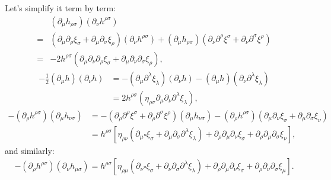 \documentclass[aps,prd,preprint]{revtex4-1}
\begin{document}
Let's simplify it term by term:
\begin{align}
& \left( \partial_\mu h_{\rho \sigma} \right) \left( \partial_\nu h^{\rho \sigma} \right)\\
= & \left( \partial_\mu \partial_\rho \xi_\sigma + \partial_\mu \partial_\sigma \xi_\rho \right)
    \left( \partial_\nu h^{\rho \sigma} \right) +
  \left( \partial_\mu h_{\rho \sigma} \right) \left( \partial_\nu \partial^\rho \xi^\sigma +
    \partial_\nu \partial^\sigma \xi^\rho \right) \\
= & -2 h^{\rho\sigma} \left( \partial_\mu \partial_\nu \partial_\rho \xi_\sigma +
    \partial_\mu \partial_\nu \partial_\sigma \xi_\rho \right), \label{eq:first-term}
\end{align}
\begin{align}
-\frac{1}{2} \left( \partial_\mu h \right) \left( \partial_\nu h \right) & =
  -\left( \partial_\mu \partial^\lambda \xi_\lambda \right) \left( \partial_\nu h \right) -
  \left( \partial_\mu h \right) \left( \partial_\nu \partial^\lambda \xi_\lambda \right) \\
& = 2 h^{\rho\sigma} \left( \eta_{\rho\sigma} \partial_\mu \partial_\nu \partial^\lambda \xi_\lambda \right),
  \label{eq:second-term}
\end{align}
\begin{align}
-\left( \partial_\rho h^{\rho \sigma} \right) \left( \partial_\mu h_{\nu \sigma} \right) & =
  -\left( \partial_\rho \partial^\rho \xi^\sigma + \partial_\rho \partial^\sigma \xi^\rho \right)
    \left( \partial_\mu h_{\nu \sigma} \right) -
  \left( \partial_\rho h^{\rho \sigma} \right) \left( \partial_\mu \partial_\nu \xi_\sigma +
    \partial_\mu \partial_\sigma \xi_\nu \right) \\
& = h^{\rho \sigma} \left[
  \eta_{\rho \nu} \left( \partial_\mu \square \xi_\sigma +
    \partial_\mu \partial_\sigma \partial^\lambda \xi_\lambda \right) +
    \partial_\rho \partial_\mu \partial_\nu \xi_\sigma +
    \partial_\rho \partial_\mu \partial_\sigma \xi_\nu \right], \label{eq:third-term}
\end{align}
and similarly:
\begin{align}
-\left( \partial_\rho h^{\rho \sigma} \right) \left( \partial_\nu h_{\mu \sigma} \right) =
h^{\rho \sigma} \left[
  \eta_{\rho \mu} \left( \partial_\nu \square \xi_\sigma +
    \partial_\nu \partial_\sigma \partial^\lambda \xi_\lambda \right) +
    \partial_\rho \partial_\mu \partial_\nu \xi_\sigma +
    \partial_\rho \partial_\nu \partial_\sigma \xi_\mu \right]. \label{eq:fourth-term}
\end{align}
\end{document}

